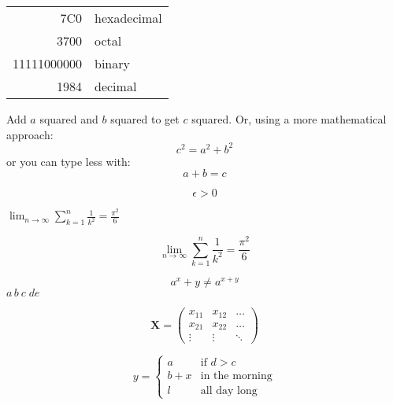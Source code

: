 \documentclass[11pt, twoside, a4paper]{article}
\begin{document}
    \begin{tabular}{|r|l|}
        \hline
        7C0 & hexadecimal \\
        3700 & octal \\ \cline{2-2}
        11111000000 & binary \\
        \hline \hline
        1984 & decimal \\
        \hline
\end{tabular}

Add $a$ squared and $b$ squared to get $c$ squared. Or, using
a more mathematical approach:
\begin{displaymath}
        c^{2}=a^{2}+b^{2}
\end{displaymath}
or you can type less with:
\[a+b=c\]

\begin{equation} \label{eq:eps}
    \epsilon > 0
\end{equation}


$\lim_{n \to \infty}
\sum_{k=1}^n \frac{1}{k^2}
= \frac{\pi^2}{6}$

\begin{displaymath}
    \lim_{n \to \infty}
    \sum_{k=1}^n \frac{1}{k^2}
    = \frac{\pi^2}{6}
\end{displaymath}


\begin{equation}
    a^x+y \neq a^{x+y}
\end{equation}
$a\,b\:c\;d\!e$

\begin{displaymath}
    \mathbf{X} =
    \left( \begin{array}{ccc}
    x_{11} & x_{12} & \ldots \\
    x_{21} & x_{22} & \ldots \\
    \vdots & \vdots & \ddots
    \end{array} \right)
\end{displaymath}

\begin{displaymath}
    y = \left\{ \begin{array}{ll}
    a & \textrm{if $d>c$}\\
    b+x & \textrm{in the morning}\\
    l & \textrm{all day long}
    \end{array} \right.
\end{displaymath}
\end{document}
